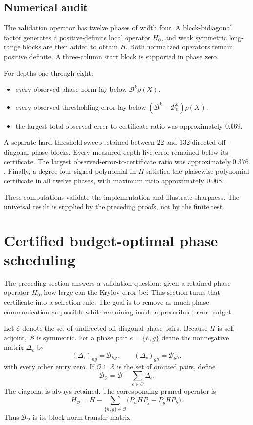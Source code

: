 \subsection{Numerical audit}

The validation operator has twelve phases of width four.  A block-bidiagonal
factor generates a positive-definite local operator $H_0$, and weak symmetric
long-range blocks are then added to obtain $H$.  Both normalized operators
remain positive definite.  A three-column start block is supported in phase
zero.

For depths one through eight:
\begin{itemize}
\item every observed phase norm lay below $\mathcal B^k\rho(X)$.
\item every observed thresholding error lay below
$(\mathcal B^k-\mathcal B_0^k)\rho(X)$.
\item the largest total observed-error-to-certificate ratio was approximately
$0.669$.
\end{itemize}

A separate hard-threshold sweep retained between $22$ and $132$ directed
off-diagonal phase blocks.  Every measured depth-five error remained below its
certificate. The largest observed-error-to-certificate ratio was approximately
$0.376$.  Finally, a degree-four signed polynomial in $H$ satisfied the
phasewise polynomial certificate in all twelve phases, with maximum ratio
approximately $0.068$.

These computations validate the implementation and illustrate sharpness.  The
universal result is supplied by the preceding proofs, not by the finite test.



\section{Certified budget-optimal phase scheduling}\label{sec:final-16}
\label{sec:budget-scheduler}

The preceding section answers a validation question: given a retained phase
operator $H_0$, how large can the Krylov error be?  This section turns that
certificate into a selection rule.  The goal is to remove as much phase
communication as possible while remaining inside a prescribed error budget.

Let $\mathcal E$ denote the set of undirected off-diagonal phase pairs.  Because
$H$ is self-adjoint, $\mathcal B$ is symmetric.  For a phase pair
$e=\{h,g\}$ define the nonnegative matrix $\Delta_e$ by
\[
(\Delta_e)_{hg}=\mathcal B_{hg},\qquad
(\Delta_e)_{gh}=\mathcal B_{gh},
\]
with every other entry zero.  If $\mathcal O\subseteq\mathcal E$ is the set
of omitted pairs, define
\[
\mathcal B_{\mathcal O}
=\mathcal B-\sum_{e\in\mathcal O}\Delta_e.
\]
The diagonal is always retained. The corresponding pruned operator is
\[
H_{\mathcal O}
=H-\sum_{\{h,g\}\in\mathcal O}
\bigl(P_hHP_g+P_gHP_h\bigr).
\]
Thus $\mathcal B_{\mathcal O}$ is its block-norm transfer matrix.

